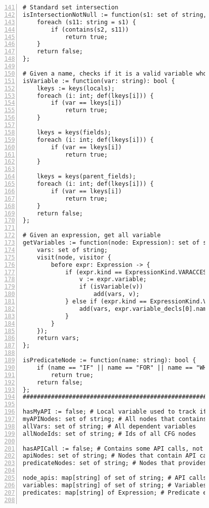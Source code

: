\begin{figure}[ht!]
\begin{lstlisting}[numbers=left, tabsize=4, escapechar=@, caption={API Usage Mining Analysis},label={lst:aun-code},  firstline = 141, firstnumber = 141, lastline = 201]
# Standard set intersection
isIntersectionNotNull := function(s1: set of string, s2: set of string): bool {
    foreach (s11: string = s1) {
        if (contains(s2, s11))
            return true;
    }
    return false;
};

# Given a name, checks if it is a valid variable whose type is available
isVariable := function(var: string): bool {
    lkeys := keys(locals);
    foreach (i: int; def(lkeys[i])) {
        if (var == lkeys[i])
            return true;
    }
    
    lkeys = keys(fields);
    foreach (i: int; def(lkeys[i])) {
        if (var == lkeys[i])
            return true;
    }
    
    lkeys = keys(parent_fields);
    foreach (i: int; def(lkeys[i])) {
        if (var == lkeys[i])
            return true;
    }
    return false;
};

# Given an expression, get all variable
getVariables := function(node: Expression): set of string {
    vars: set of string;
    visit(node, visitor {
        before expr: Expression -> {
            if (expr.kind == ExpressionKind.VARACCESS) {
                v := expr.variable;
                if (isVariable(v))
                    add(vars, v);
            } else if (expr.kind == ExpressionKind.VARDECL) {
                add(vars, expr.variable_decls[0].name);
            }
        }
    });
    return vars;
};

isPredicateNode := function(name: string): bool {
    if (name == "IF" || name == "FOR" || name == "WHILE")
        return true;
    return false;
};
#########################################################

hasMyAPI := false; # Local variable used to track if a node contains API method of interest
myAPINodes: set of string; # All nodes that contains API methods of interest
allVars: set of string; # All dependent variables
allNodeIds: set of string; # Ids of all CFG nodes

hasAPICall := false; # Contains some API calls, not necessarily API call of interest
apiNodes: set of string; # Nodes that contain API calls
predicateNodes: set of string; # Nodes that provides predicates

node_apis: map[string] of set of string; # API calls at nodes
variables: map[string] of set of string; # Variables at nodes
predicates: map[string] of Expression; # Predicate expressions at nodes


\end{lstlisting}
\end{figure}
